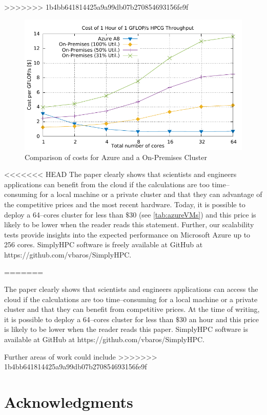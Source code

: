 \documentclass[3p,times]{elsarticle}
\begin{document}
>>>>>>> 1b4bb641814425a9a99db07b270854693156fe9f
\begin{figure}
	\centering
	\includegraphics[width=.5\linewidth]{gplt-cost}
	\caption{Comparison of costs for Azure and a On-Premises Cluster}
	\label{fig:costs}
\end{figure}

<<<<<<< HEAD
The paper clearly shows that scientists and engineers applications can benefit from the cloud if the calculations are too time--consuming for a local machine or a private cluster and that they can advantage of the competitive prices and the most recent hardware. Today, it is possible to deploy a 64--cores cluster for less than $\$30$ (see \ref{tab:azureVMs}) and this price is likely to be lower when the reader reads this statement. Further, our scalability tests provide insights into the expected performance on Microsoft Azure up to 256 cores. SimplyHPC software is freely available at GitHub at https://github.com/vbaros/SimplyHPC.

 
=======

The paper clearly shows that scientists and engineers applications can access the cloud if the calculations are too time--consuming for a local machine or a private cluster and that they can benefit from competitive prices. At the time of writing, it is possible to deploy a 64--cores cluster for less than $\$30$ an hour and this price is likely to be lower when the reader reads this paper. SimplyHPC software is available at GitHub at https://github.com/vbaros/SimplyHPC.




Further areas of work could include 
>>>>>>> 1b4bb641814425a9a99db07b270854693156fe9f

\section{Acknowledgments}
\label{sec:ackn}
\end{document}
